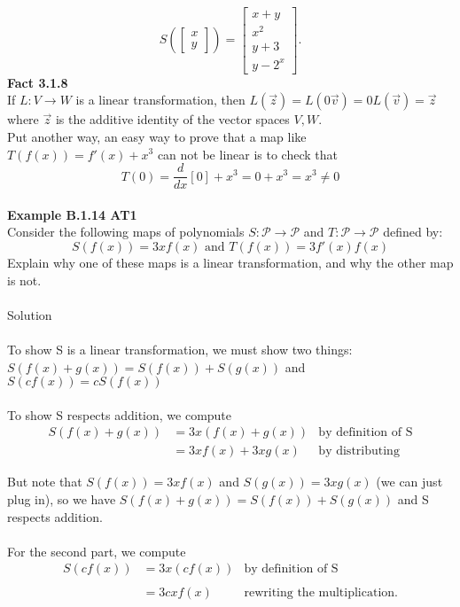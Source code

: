 \documentclass{article}
\begin{document}
\begin{equation*}
S\left(\left[\begin{array}{c} x \\ y \end{array}\right] \right)
=
\left[\begin{array}{c} x+y \\ x^2 \\ y+3 \\ y-2^x \end{array}\right]\text{.}
\end{equation*}
\textbf{Fact 3.1.8}\\
If $L:V\to W$ is a linear transformation, then $L(\vec z)=L(0\vec v)=0L(\vec v)=\vec z$ where $\vec z$ is the additive identity of the vector spaces $V, W$.\\
Put another way, an easy way to prove that a map like $T(f(x)) = f'(x)+x^3$
can not be linear is to check that \begin{equation*}
T(0)=\frac{d}{dx}[0]+x^3=0+x^3=x^3\neq0\end{equation*}
\\
\textbf{Example B.1.14 AT1}\\
Consider the following maps of polynomials $S: \mathcal{P} \rightarrow \mathcal{P}$ and $T:\mathcal{P}\rightarrow\mathcal{P}$ defined by:
\begin{equation*}
S(f(x))= 3xf(x) \text{ and }T(f(x)) = 3f'(x)f(x)
\end{equation*}
Explain why one of these maps is a linear transformation, and why the other
map is not.\\
\\
Solution\\
\\
To show S is a linear transformation, we must show two things:\\
$
S\left(f(x)+g(x)\right)=S(f(x))+S(g(x)) 
$ and $S(cf(x)) = cS(f(x))$\\
\\
To show S respects addition, we compute
\begin{align*}
S\left(  f(x)+g(x)  \right) &= 3x\left(  f(x)+g(x)  \right) & \text{by definition of S} \\ 
                            &= 3xf(x)+3xg(x)                & \text{by distributing}
\end{align*}

But note that $S(f(x))=3xf(x)$ and $S(g(x))=3xg(x)$ (we can just plug in), so we have $S(f(x)+g(x))=S(f(x))+S(g(x))$ and S respects addition.\\
\\
For the second part, we compute
\begin{align*}
S\left( cf(x) \right) &= 3x \left( cf(x) \right) & \text{by definition of S} \\\\
                      &= 3cxf(x)                 & \text{rewriting the multiplication.}
\end{align*}
\end{document}

